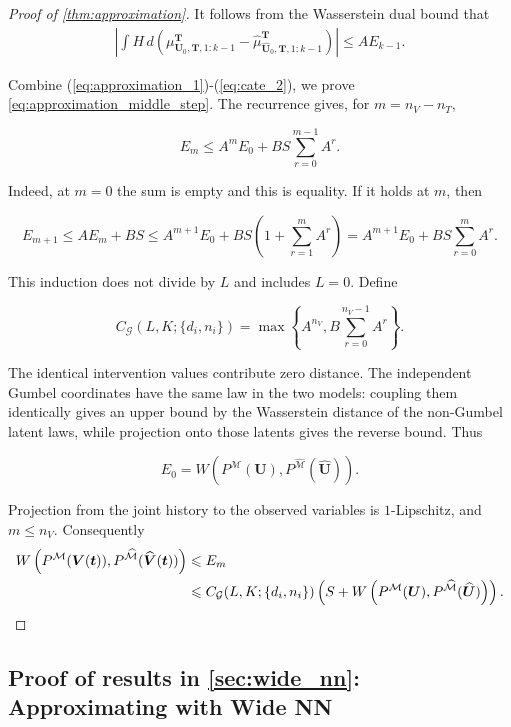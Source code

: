 \begin{proof}[Proof of \cref{thm:approximation}]
It follows from the Wasserstein dual bound that
\begin{align}\label{eq:cate_2}
\left|\int H\,d\left(\mu_{\boldsymbol U_0,\boldsymbol T,1:k-1}^{\boldsymbol T}-\hat\mu_{\hat{\boldsymbol U}_0,\boldsymbol T,1:k-1}^{\boldsymbol T}\right)\right|\leqslant A E_{k-1}.
\end{align}

  Combine (\ref{eq:approximation_1})-(\ref{eq:cate_2}), we prove \cref{eq:approximation_middle_step}. The recurrence gives, for $m=n_V-n_T$,

\[
E_m\leqslant A^mE_0+BS\sum_{r=0}^{m-1}A^r.
\]

Indeed, at $m=0$ the sum is empty and this is equality. If it holds at $m$, then

\[
E_{m+1}\leqslant AE_m+BS\leqslant A^{m+1}E_0+BS\left(1+\sum_{r=1}^{m}A^r\right)=A^{m+1}E_0+BS\sum_{r=0}^{m}A^r.
\]

This induction does not divide by $L$ and includes $L=0$.
  Define

\[
C_{\mathcal G}(L,K;\{d_i,n_i\})=\max\left\{A^{n_V},B\sum_{r=0}^{n_V-1}A^r\right\}.
\]

The identical intervention values contribute zero distance. The independent Gumbel coordinates have the same law in the two models: coupling them identically gives an upper bound by the Wasserstein distance of the non-Gumbel latent laws, while projection onto those latents gives the reverse bound. Thus

\[
E_0=W\left(P^{\mathcal M}(\boldsymbol U),P^{\hat{\mathcal M}}(\hat{\boldsymbol U})\right).
\]

Projection from the joint history to the observed variables is $1$-Lipschitz, and $m\leqslant n_V$. Consequently
\begin{align}\label{eq:conclu}
W\left(P^{\mathcal M}(\boldsymbol V(\boldsymbol t)),P^{\hat{\mathcal M}}(\hat{\boldsymbol V}(\boldsymbol t))\right)
&\leqslant E_m\notag\\
&\leqslant C_{\mathcal G}(L,K;\{d_i,n_i\})\left(S+W\left(P^{\mathcal M}(\boldsymbol U),P^{\hat{\mathcal M}}(\hat{\boldsymbol U})\right)\right).
\end{align}
\end{proof}


\subsection{Proof of results in \cref{sec:wide_nn}: Approximating with Wide NN}

